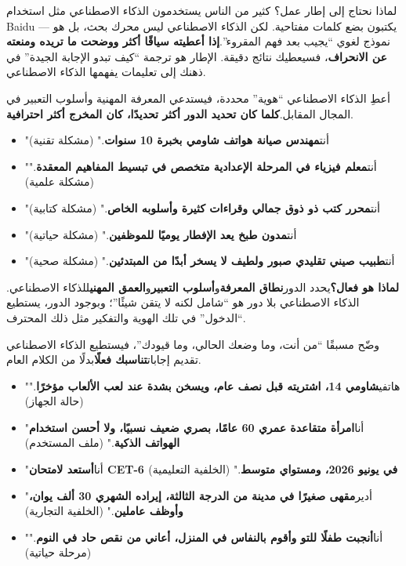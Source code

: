 \begin{tcbinfo}{لماذا نحتاج إلى إطار عمل؟}
كثير من الناس يستخدمون الذكاء الاصطناعي مثل استخدام Baidu — يكتبون بضع كلمات مفتاحية. لكن الذكاء الاصطناعي ليس محرك بحث، بل هو نموذج لغوي “يجيب بعد فهم المقروء”.\textbf{إذا أعطيته سياقًا أكثر ووضحت ما تريده ومنعته عن الانحراف}، فسيعطيك نتائج دقيقة. الإطار هو ترجمة “كيف تبدو الإجابة الجيدة” في ذهنك إلى تعليمات يفهمها الذكاء الاصطناعي.

\end{tcbinfo}


أعطِ الذكاء الاصطناعي “هوية” محددة، فيستدعي المعرفة المهنية وأسلوب التعبير في المجال المقابل.\textbf{كلما كان تحديد الدور أكثر تحديدًا، كان المخرج أكثر احترافية}.


\begin{itemize}
  \item "أنت\textbf{مهندس صيانة هواتف شاومي بخبرة 10 سنوات}." (مشكلة تقنية)
  \item "أنت\textbf{معلم فيزياء في المرحلة الإعدادية متخصص في تبسيط المفاهيم المعقدة}." (مشكلة علمية)
  \item "أنت\textbf{محرر كتب ذو ذوق جمالي وقراءات كثيرة وأسلوبه الخاص}." (مشكلة كتابية)
  \item "أنت\textbf{مدون طبخ يعد الإفطار يوميًا للموظفين}." (مشكلة حياتية)
  \item "أنت\textbf{طبيب صيني تقليدي صبور ولطيف لا يسخر أبدًا من المبتدئين}." (مشكلة صحية)
\end{itemize}

\textbf{لماذا هو فعال؟}يحدد الدور\textbf{نطاق المعرفة}و\textbf{أسلوب التعبير}و\textbf{العمق المهني}للذكاء الاصطناعي. الذكاء الاصطناعي بلا دور هو “شامل لكنه لا يتقن شيئًا”؛ وبوجود الدور، يستطيع “الدخول” في تلك الهوية والتفكير مثل ذلك المحترف.


وضّح مسبقًا “من أنت، وما وضعك الحالي، وما قيودك”، فيستطيع الذكاء الاصطناعي تقديم إجابات\textbf{تناسبك فعلًا}بدلًا من الكلام العام.


\begin{itemize}
  \item "هاتفي\textbf{شاومي 14، اشتريته قبل نصف عام، ويسخن بشدة عند لعب الألعاب مؤخرًا}." (حالة الجهاز)
  \item "أنا\textbf{امرأة متقاعدة عمري 60 عامًا، بصري ضعيف نسبيًا، ولا أحسن استخدام الهواتف الذكية}." (ملف المستخدم)
  \item "أنا\textbf{أستعد لامتحان CET-6 في يونيو 2026، ومستواي متوسط}." (الخلفية التعليمية)
  \item "أدير\textbf{مقهى صغيرًا في مدينة من الدرجة الثالثة، إيراده الشهري 30 ألف يوان، وأوظف عاملين}." (الخلفية التجارية)
  \item "أنا\textbf{أنجبت طفلًا للتو وأقوم بالنفاس في المنزل، أعاني من نقص حاد في النوم}." (مرحلة حياتية)
\end{itemize}

